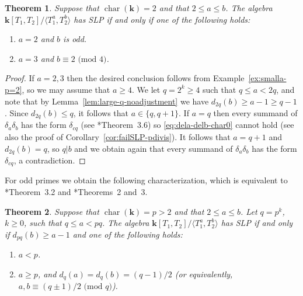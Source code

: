 \documentclass[11pt,reqno]{amsart}
\def\kk{{\mathbf k}}
\newcommand{\op}[1]{\operatorname{#1}}
\newtheorem{theorem}{Theorem}[section]
\theoremstyle{definition}
\theoremstyle{remark}
\numberwithin{equation}{section}
\begin{document}
\begin{theorem}\label{thm:SLP-n=p=2}
    Suppose that $\op{char}(\kk)=2$ and that $2\leq a\leq b$. The algebra $\kk[T_1,T_2]/\langle T_1^a,T_2^b\rangle$ has SLP if and only if one of the following holds:
    \begin{enumerate}
        \item $a=2$ and $b$ is odd.
        \item $a=3$ and $b\equiv 2\text{ (mod 4)}$.
    \end{enumerate}
\end{theorem}

\begin{proof}
    If $a=2,3$ then the desired conclusion follows from Example~\ref{ex:smalla-p=2}, so we may assume that $a\geq 4$. We let $q=2^k\geq 4$ such that $q\leq a<2q$, and note that by Lemma~\ref{lem:large-q-noadjustment} we have $d_{2q}(b)\geq a-1\geq q-1$. Since $d_{2q}(b)\leq q$, it follows that $a\in\{q,q+1\}$. If $a=q$ then every summand of $\delta_a\delta_b$ has the form $\delta_{cq}$ (see \cite{han-monsky}*{Theorem~3.6}) so \eqref{eq:dela-delb-char0} cannot hold (see also the proof of Corollary~\ref{cor:failSLP-pdivis}). It follows that $a=q+1$ and $d_{2q}(b)=q$, so $q|b$ and we obtain again that every summand of $\delta_a\delta_b$ has the form $\delta_{cq}$, a contradiction.
\end{proof}

For odd primes we obtain the following characterization, which is equivalent to \cite{nick}*{Theorem~3.2} and \cite{StandardJordan}*{Theorems~2 and~3}.

\begin{theorem}\label{thm:SLP-n=2-p>2}
    Suppose that $\op{char}(\kk)=p>2$ and that $2\leq a\leq b$. Let $q=p^k$, $k\geq 0$, such that $q\leq a<pq$. The algebra $\kk[T_1,T_2]/\langle T_1^a,T_2^b\rangle$ has SLP if and only if $d_{pq}(b)\geq a-1$ and one of the following holds:
    \begin{enumerate}
        \item $a<p$.
        \item $a\geq p$, and $d_q(a)=d_q(b)=(q-1)/2$ (or equivalently, $a,b\equiv (q\pm 1)/2\text{ (mod $q$)}$).
    \end{enumerate}
\end{theorem}
\end{document}
